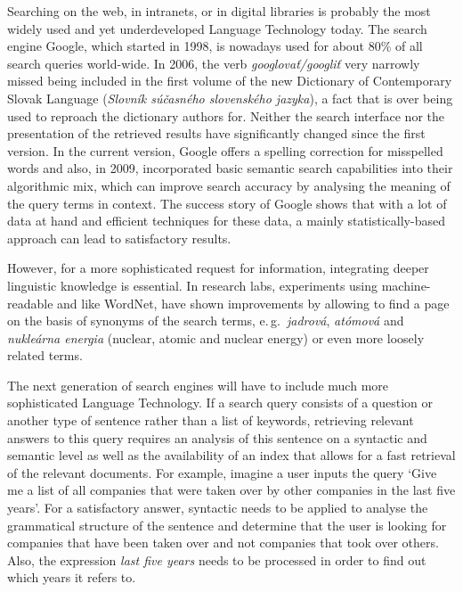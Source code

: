 \begin{multicols}{2}
Searching on the web, in intranets, or in digital libraries is probably the most widely used and yet underdeveloped Language Technology today. The search engine Google, which started in 1998, is nowadays used for about 80\% of all search queries world-wide. In 2006, the verb \emph{googlovať/googliť} very narrowly missed being included in the first volume of the new Dictionary of Contemporary Slovak Language (\emph{Slovník súčasného slovenského jazyka}), a fact that is over being used to reproach the dictionary authors for. Neither the search interface nor the presentation of the retrieved results have significantly changed since the first version. In the current version, Google offers a spelling correction for misspelled words and also, in 2009, incorporated basic semantic search capabilities into their algorithmic mix\cite{pc1}, which can improve search accuracy by analysing the meaning of the query terms in context. The success story of Google shows that with a lot of data at hand and efficient techniques for  these data, a mainly statistically-based approach can lead to satisfactory results. 

However, for a more sophisticated request for information, integrating deeper linguistic knowledge is essential. In research labs, experiments using machine-readable  and  like WordNet, have shown improvements by allowing to find a page on the basis of synonyms of the search terms, e.\,g.~\emph{jadrová}, \emph{atómová} and \emph{nukleárna energia} (nuclear, atomic and nuclear energy) or even more loosely related terms. 


The next generation of search engines will have to include much more sophisticated Language Technology. If a search query consists of a question or another type of sentence rather than a list of keywords, retrieving relevant answers to this query requires an analysis of this sentence on a syntactic and semantic level as well as the availability of an index that allows for a fast retrieval of the relevant documents. For example, imagine a user inputs the query ‘Give me a list of all companies that were taken over by other companies in the last five years’. For a satisfactory answer, syntactic  needs to be applied to analyse the grammatical structure of the sentence and determine that the user is looking for companies that have been taken over and not companies that took over others. Also, the expression \emph{last five years} needs to be processed in order to find out which years it refers to. 


\end{multicols}
